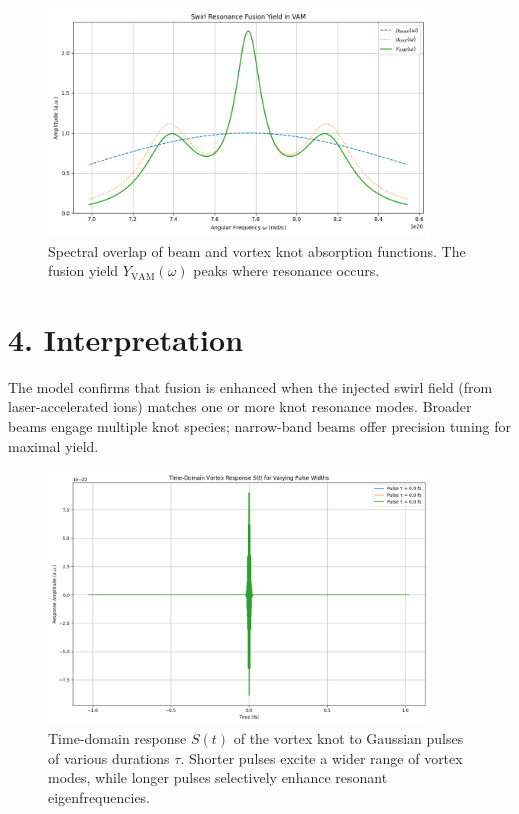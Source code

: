 \documentclass{article}
\begin{document}
\begin{figure}[h!]
  \centering
  \includegraphics[width=0.9\textwidth]{vam_swirl_yield_plot}
  \caption{Spectral overlap of beam and vortex knot absorption functions. The fusion yield $Y_{\mathrm{VAM}}(\omega)$ peaks where resonance occurs.}
\end{figure}

\section*{4. Interpretation}
The model confirms that fusion is enhanced when the injected swirl field (from laser-accelerated ions) matches one or more knot resonance modes. Broader beams engage multiple knot species; narrow-band beams offer precision tuning for maximal yield.

\begin{figure}[h!]
  \centering
  \includegraphics[width=0.9\textwidth]{vam_time_response_plot}
  \caption{Time-domain response $S(t)$ of the vortex knot to Gaussian pulses of various durations $\tau$. Shorter pulses excite a wider range of vortex modes, while longer pulses selectively enhance resonant eigenfrequencies.}
\end{figure}
\end{document}
